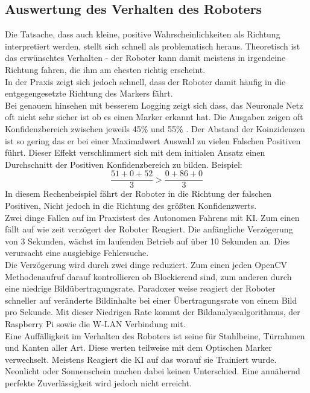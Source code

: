 \documentclass[conference]{IEEEtran}
\begin{document}

\subsection {Auswertung des Verhalten des Roboters}	%

Die Tatsache, dass auch kleine, positive Wahrscheinlichkeiten als Richtung 
interpretiert werden, stellt sich schnell als problematisch heraus.
Theoretisch ist das erwünschtes Verhalten - der Roboter kann damit 
meistens in irgendeine Richtung fahren, die ihm am ehesten richtig 
erscheint.\\
In der Praxis zeigt sich jedoch schnell, dass der Roboter damit häufig in die 
entgegengesetzte Richtung des Markers fährt. \\

Bei genauem hinsehen mit besserem Logging  zeigt sich dass, das Neuronale 
Netz oft nicht sehr sicher ist ob es einen Marker erkannt hat. Die Ausgaben 
zeigen  oft Konfidenzbereich  zwischen jeweils 45\% und 55\% . Der Abstand 
der Koinzidenzen ist so gering das er bei einer Maximalwert Auswahl zu 
vielen Falschen Positiven führt. Dieser Effekt verschlimmert sich mit dem 
initialen Ansatz einen Durchschnitt  der Positiven Konfidenzbereich zu 
bilden. Beispiel:
\[
\frac{51 + 0 +52 }{3} > \frac{0 + 86 + 0}{3}
\]
In diesem Rechenbeispiel fährt der Roboter in die Richtung der falschen 
Positiven, Nicht jedoch in die Richtung des größten Konfidenzwerts.\\

Zwei dinge Fallen auf im Praxistest des Autonomen Fahrens mit KI. Zum 
einen fällt auf wie zeit verzögert der Roboter Reagiert. Die anfängliche 
Verzögerung von 3 Sekunden, wächst im laufenden 
Betrieb auf über 10 Sekunden an. Dies verursacht eine ausgiebige 
Fehlersuche. \\

Die Verzögerung wird durch zwei dinge reduziert. Zum einen 
jeden OpenCV Methodenaufruf  darauf kontrollieren ob Blockierend sind, 
zum anderen durch eine niedrige Bildübertragungsrate. Paradoxer weise 
reagiert der Roboter schneller auf veränderte Bildinhalte bei einer 
Übertragungsrate von einem Bild pro Sekunde. Mit dieser Niedrigen Rate 
kommt der Bildanalysealgorithmus, der Raspberry Pi sowie die W-LAN 
Verbindung mit. \\
Eine Auffälligkeit im Verhalten des Roboters ist seine  
für Stuhlbeine, Türrahmen und Kanten aller Art. Diese werten teilweise mit 
dem Optischen Marker verwechselt. Meistens Reagiert die KI auf das worauf 
sie Trainiert wurde. Neonlicht oder Sonnenschein machen dabei keinen 
Unterschied. Eine annähernd perfekte Zuverlässigkeit wird jedoch nicht 
erreicht. 
\end{document}
